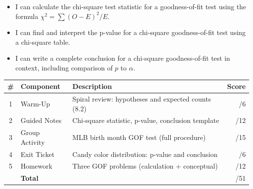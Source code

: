 \documentclass[10pt]{article}
\begin{document}

\vspace{2.4cm}
\namedateperiod

\begin{learningtargetbox}
\begin{itemize}
    \item I can calculate the chi-square test statistic for a goodness-of-fit test
          using the formula $\chi^2 = \sum (O - E)^2 / E$.
    \item I can find and interpret the p-value for a chi-square goodness-of-fit test
          using a chi-square table.
    \item I can write a complete conclusion for a chi-square goodness-of-fit test
          in context, including comparison of $p$ to $\alpha$.
\end{itemize}
\end{learningtargetbox}

\begin{tocbox}
\renewcommand{\arraystretch}{1.5}
\begin{tabularx}{\linewidth}{@{} c l X r @{}}
    \textbf{\#} & \textbf{Component} & \textbf{Description} & \textbf{Score} \\
    \hline
    1 & Warm-Up        & Spiral review: hypotheses and expected counts (8.2)  & \hfill/6  \\
    2 & Guided Notes   & Chi-square statistic, p-value, conclusion template    & \hfill/12 \\
    3 & Group Activity & MLB birth month GOF test (full procedure)             & \hfill/15 \\
    4 & Exit Ticket    & Candy color distribution: p-value and conclusion      & \hfill/6  \\
    5 & Homework       & Three GOF problems (calculation + conceptual)         & \hfill/12 \\
    \hline
       & \multicolumn{2}{l}{\textbf{Total}} & \hfill/51 \\
\end{tabularx}
\end{tocbox}
\end{document}

